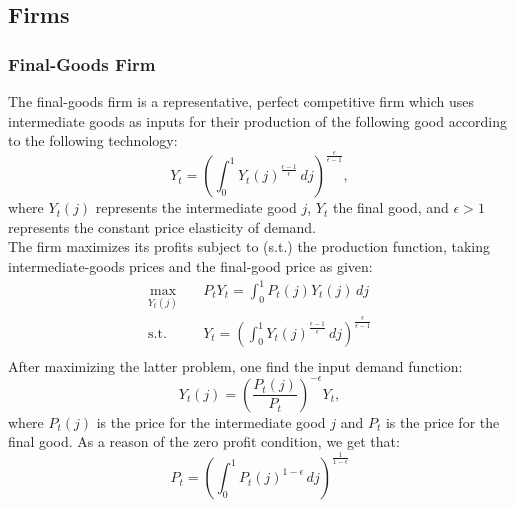 \documentclass[11pt, a4paper, leqno]{article}
\begin{document}
\subsection{Firms}
\subsubsection{Final-Goods Firm}
The final-goods firm is a representative, perfect competitive firm which uses intermediate goods as inputs for their production of the following good according to the following technology:
\begin{equation}
	Y_{t} = \left( \int_{0}^{1} Y_{t}(j)^{\frac{\epsilon -1}{\epsilon}} \,dj \right)^{\frac{\epsilon}{\epsilon -1}},
\end{equation}
where $Y_{t}(j)$ represents the intermediate good $j$, $Y_{t}$ the final good, and $\epsilon >1$ represents the constant price elasticity of demand.\\
The firm maximizes its profits subject to (s.t.) the production function, taking intermediate-goods prices and the final-good price as given:
\begin{equation*}
	\begin{aligned}
		\max_{Y_{t}(j)} \quad & P_{t}Y_{t} = \int_{0}^{1} P_{t}(j)Y_{t}(j) \,dj\\
		\textrm{s.t.} \quad & Y_{t} = \left( \int_{0}^{1} Y_{t}(j)^{\frac{\epsilon -1}{\epsilon}} \,dj \right)^{\frac{\epsilon}{\epsilon -1}} \\
	\end{aligned}
\end{equation*}
After maximizing the latter problem, one find the input demand function:
\begin{equation}
		Y_{t}(j) = \left( \frac{P_{t}(j)}{P_{t}} \right)^{- \epsilon} Y_{t},
\end{equation}
where $P_{t}(j)$ is the price for the intermediate good $j$ and $P_{t}$ is the price for the final good.
As a reason of the zero profit condition, we get that:
\begin{equation}
		P_{t} = \left( \int_{0}^{1} P_{t}(j)^{1- \epsilon} \,dj \right)^{ \frac{1}{1- \epsilon}}
\end{equation}
\end{document}
